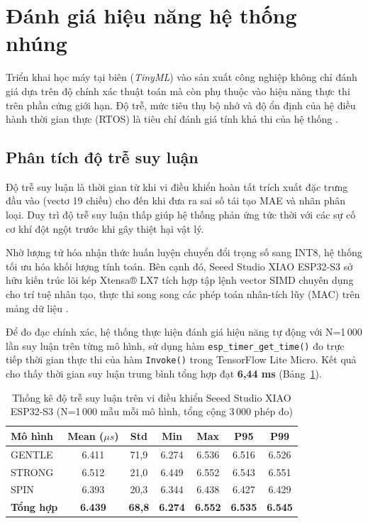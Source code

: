 ﻿



\section{Đánh giá hiệu năng hệ thống nhúng}

Triển khai học máy tại biên (\textit{TinyML}) vào sản xuất công nghiệp không chỉ đánh giá dựa trên độ chính xác thuật toán mà còn phụ thuộc vào hiệu năng thực thi trên phần cứng giới hạn. Độ trễ, mức tiêu thụ bộ nhớ và độ ổn định của hệ điều hành thời gian thực (RTOS) là tiêu chí đánh giá tính khả thi của hệ thống \cite{ref_mlperf_tiny}.

\subsection{Phân tích độ trễ suy luận}

Độ trễ suy luận là thời gian từ khi vi điều khiển hoàn tất trích xuất đặc trưng đầu vào (vectơ 19 chiều) cho đến khi đưa ra sai số tái tạo MAE và nhãn phân loại. Duy trì độ trễ suy luận thấp giúp hệ thống phản ứng tức thời với các sự cố cơ khí đột ngột trước khi gây thiệt hại vật lý.

Nhờ lượng tử hóa nhận thức huấn luyện chuyển đổi trọng số sang INT8, hệ thống tối ưu hóa khối lượng tính toán. Bên cạnh đó, Seeed Studio XIAO ESP32-S3 sở hữu kiến trúc lõi kép Xtensa® LX7 tích hợp tập lệnh vector SIMD chuyên dụng cho trí tuệ nhân tạo, thực thi song song các phép toán nhân-tích lũy (MAC) trên mảng dữ liệu \cite{ref_1_15, ref_1_7}.

Để đo đạc chính xác, hệ thống thực hiện đánh giá hiệu năng tự động với N=1\,000 lần suy luận trên từng mô hình, sử dụng hàm \texttt{esp\_timer\_get\_time()} đo trực tiếp thời gian thực thi của hàm \texttt{Invoke()} trong TensorFlow Lite Micro. Kết quả cho thấy thời gian suy luận trung bình tổng hợp đạt \textbf{6,44 ms} (Bảng~\ref{tab:latency_stats}).

\begin{table}[H]
\centering
\caption[Thống kê độ trễ suy luận]{Thống kê độ trễ suy luận trên vi điều khiển Seeed Studio XIAO ESP32-S3 (N=1\,000 mẫu mỗi mô hình, tổng cộng 3\,000 phép đo)}
\label{tab:latency_stats}
\begin{tabular}{|l|c|c|c|c|c|c|}
\hline
\textbf{Mô hình} & \textbf{Mean ($\mu s$)} & \textbf{Std} & \textbf{Min} & \textbf{Max} & \textbf{P95} & \textbf{P99} \\ \hline
GENTLE & 6.411 & 71,9 & 6.274 & 6.536 & 6.516 & 6.526 \\ \hline
STRONG & 6.512 & 21,0 & 6.449 & 6.552 & 6.543 & 6.551 \\ \hline
SPIN   & 6.393 & 20,3 & 6.344 & 6.438 & 6.427 & 6.429 \\ \hline
\rowcolor[HTML]{EFEFEF}
\textbf{Tổng hợp} & \textbf{6.439} & \textbf{68,8} & \textbf{6.274} & \textbf{6.552} & \textbf{6.535} & \textbf{6.545} \\ \hline
\end{tabular}
\end{table}

